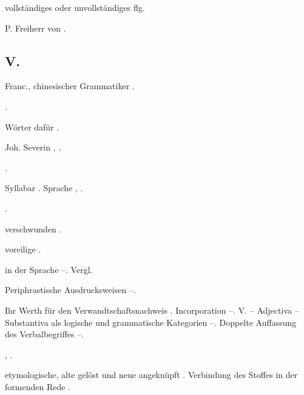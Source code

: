 \begin{register}

 vollständiges oder unvollständiges \pageref{sp.320} flg.



 P. Freiherr von \pageref{sp.69}.



\subsection*{V.}\label{reg.V}

 Franc., chinesischer Grammatiker \pageref{sp.25}.

 \pageref{sp.21}.

 Wörter dafür \pageref{sp.153}.

 Joh. Severin \sed{\pageref{sp.15},} \pageref{sp.28}, \pageref{sp.31}.

 \pageref{sp.22}\sed{, \pageref{sp.361}}.

 Syllabar \pageref{sp.131}. Sprache \pageref{sp.150}, \pageref{sp.282}.

 \pageref{sp.36}.

 verschwunden \pageref{sp.146}.

 voreilige \pageref{sp.77}.

 in der Sprache  \pageref{sp.168}–\pageref{sp.172}. Vergl. 

 Periphrastische Ausdrucksweisen \pageref{sp.239}–\pageref{sp.243}.


 Ihr Werth für den Verwandtschaftsnachweis \pageref{sp.152}. Incorporation \pageref{sp.354}–\pageref{sp.359}. V. – Adjectiva – Substantiva als logische und grammatische Kategorien \pageref{sp.381}–\pageref{sp.385}. Doppelte Auffassung des Verbalbegriffes \pageref{sp.382}–\pageref{sp.385}.

 \pageref{sp.466}, \pageref{sp.467}.

 etymologische, alte gelöst und neue angeknüpft \pageref{sp.61}. Verbindung des Stoffes in der formenden Rede \pageref{sp.324}.


\end{register}
